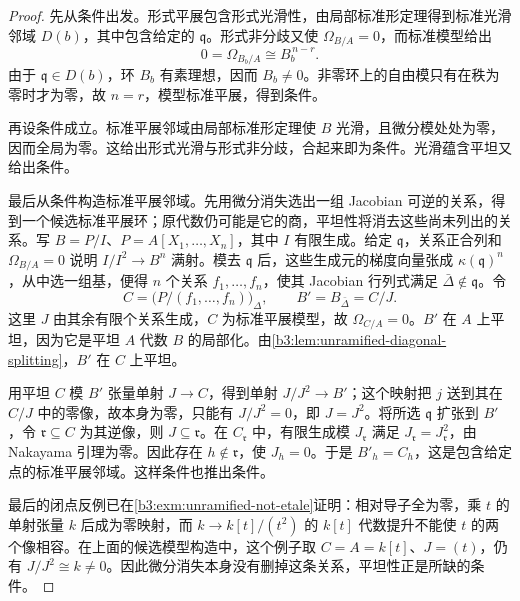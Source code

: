 \begin{proof}
	先从条件出发。形式平展包含形式光滑性，由局部标准形定理得到标准光滑邻域 \(D(b)\)，其中包含给定的 \(\mathfrak q\)。形式非分歧又使 \(\Omega_{B/A}=0\)，而标准模型给出
	\[
		0=\Omega_{B_b/A}\cong B_b^{\,n-r}.
	\]
	由于 \(\mathfrak q\in D(b)\)，环 \(B_b\) 有素理想，因而 \(B_b\ne0\)。非零环上的自由模只有在秩为零时才为零，故 \(n=r\)，模型标准平展，得到条件。

	再设条件成立。标准平展邻域由局部标准形定理使 \(B\) 光滑，且微分模处处为零，因而全局为零。这给出形式光滑与形式非分歧，合起来即为条件。光滑蕴含平坦又给出条件。

	最后从条件构造标准平展邻域。先用微分消失选出一组 Jacobian 可逆的关系，得到一个候选标准平展环；原代数仍可能是它的商，平坦性将消去这些尚未列出的关系。写 \(B=P/I\)、\(P=A[X_1,\ldots,X_n]\)，其中 \(I\) 有限生成。给定 \(\mathfrak q\)，关系正合列和 \(\Omega_{B/A}=0\) 说明 \(I/I^2\to B^n\) 满射。模去 \(\mathfrak q\) 后，这些生成元的梯度向量张成 \(\kappa(\mathfrak q)^n\)，从中选一组基，便得 \(n\) 个关系 \(f_1,\ldots,f_n\)，使其 Jacobian 行列式满足 \(\bar\Delta\notin\mathfrak q\)。令
	\[
		C=\bigl(P/(f_1,\ldots,f_n)\bigr)_\Delta, \qquad B'=B_{\bar\Delta}=C/J.
	\]
	这里 \(J\) 由其余有限个关系生成，\(C\) 为标准平展模型，故 \(\Omega_{C/A}=0\)。\(B'\) 在 \(A\) 上平坦，因为它是平坦 \(A\) 代数 \(B\) 的局部化。由\cref{b3:lem:unramified-diagonal-splitting}，\(B'\) 在 \(C\) 上平坦。

	用平坦 \(C\) 模 \(B'\) 张量单射 \(J\to C\)，得到单射 \(J/J^2\to B'\)；这个映射把 \(j\) 送到其在 \(C/J\) 中的零像，故本身为零，只能有 \(J/J^2=0\)，即 \(J=J^2\)。将所选 \(\mathfrak q\) 扩张到 \(B'\)，令 \(\mathfrak r\subseteq C\) 为其逆像，则 \(J\subseteq\mathfrak r\)。在 \(C_{\mathfrak r}\) 中，有限生成模 \(J_{\mathfrak r}\) 满足 \(J_{\mathfrak r}=J_{\mathfrak r}^2\)，由 Nakayama 引理为零。因此存在 \(h\notin\mathfrak r\)，使 \(J_h=0\)。于是 \(B'_h=C_h\)，这是包含给定点的标准平展邻域。这样条件也推出条件。

	最后的闭点反例已在\cref{b3:exm:unramified-not-etale}证明：相对导子全为零，乘 \(t\) 的单射张量 \(k\) 后成为零映射，而 \(k\to k[t]/(t^2)\) 的 \(k[t]\) 代数提升不能使 \(t\) 的两个像相容。在上面的候选模型构造中，这个例子取 \(C=A=k[t]\)、\(J=(t)\)，仍有 \(J/J^2\cong k\ne0\)。因此微分消失本身没有删掉这条关系，平坦性正是所缺的条件。
\end{proof}

